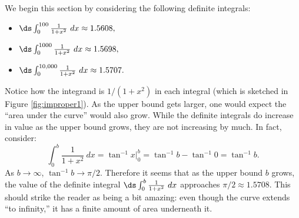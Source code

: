 We begin this section by considering the following definite integrals:
\begin{itemize}
\item	$\ds \int_0^{100}\frac1{1+x^2}\ dx \approx 1.5608,$
\item	$\ds \int_0^{1000}\frac1{1+x^2}\ dx \approx 1.5698,$
\item	$\ds \int_0^{10,000}\frac1{1+x^2}\ dx \approx 1.5707.$
\end{itemize}

Notice how the integrand is $1/(1+x^2)$ in each integral (which is sketched in Figure \ref{fig:improper1}). As the upper bound gets larger, one would expect the ``area under the curve'' would also grow. While the definite integrals do increase in value as the upper bound grows, they are not  increasing by much. In fact, consider:
$$\int_0^b \frac{1}{1+x^2}\ dx = \tan^{-1}x\Big|_0^b = \tan^{-1}b-\tan^{-1}0 = \tan^{-1}b.$$
As $b\rightarrow \infty$, $\tan^{-1}b \rightarrow \pi/2.$ Therefore it seems that as the upper bound $b$ grows, the value of the definite integral $\ds \int_0^b\frac{1}{1+x^2}\ dx$ approaches $\pi/2\approx 1.5708$. This should strike the reader as being a bit amazing: even though the curve extends ``to infinity,'' it has a finite amount of area underneath it.

